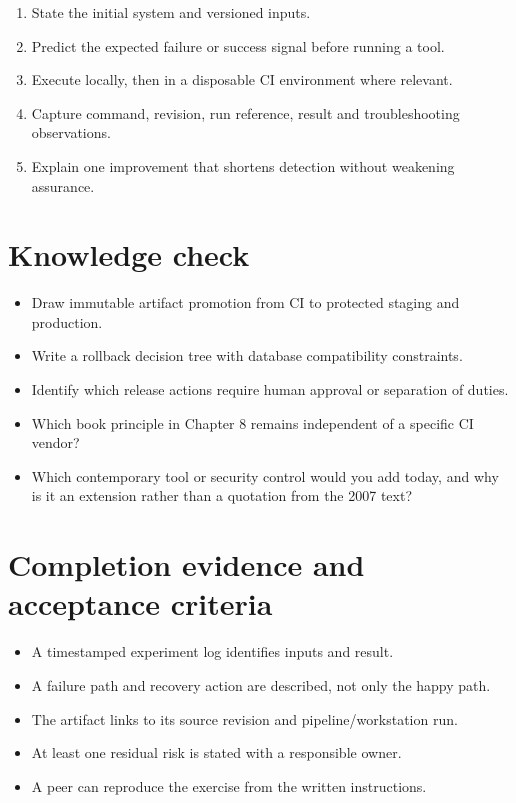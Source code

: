 \documentclass[11pt,letterpaper]{article}
\begin{document}
\begin{enumerate}
\item State the initial system and versioned inputs.
\item Predict the expected failure or success signal before running a tool.
\item Execute locally, then in a disposable CI environment where relevant.
\item Capture command, revision, run reference, result and troubleshooting observations.
\item Explain one improvement that shortens detection without weakening assurance.
\end{enumerate}
\section{Knowledge check}
\begin{itemize}
\item Draw immutable artifact promotion from CI to protected staging and production.
\item Write a rollback decision tree with database compatibility constraints.
\item Identify which release actions require human approval or separation of duties.
\item Which book principle in Chapter 8 remains independent of a specific CI vendor?
\item Which contemporary tool or security control would you add today, and why is it an extension rather than a quotation from the 2007 text?
\end{itemize}
\section{Completion evidence and acceptance criteria}
\begin{itemize}
\item A timestamped experiment log identifies inputs and result.
\item A failure path and recovery action are described, not only the happy path.
\item The artifact links to its source revision and pipeline/workstation run.
\item At least one residual risk is stated with a responsible owner.
\item A peer can reproduce the exercise from the written instructions.
\end{itemize}
\end{document}
